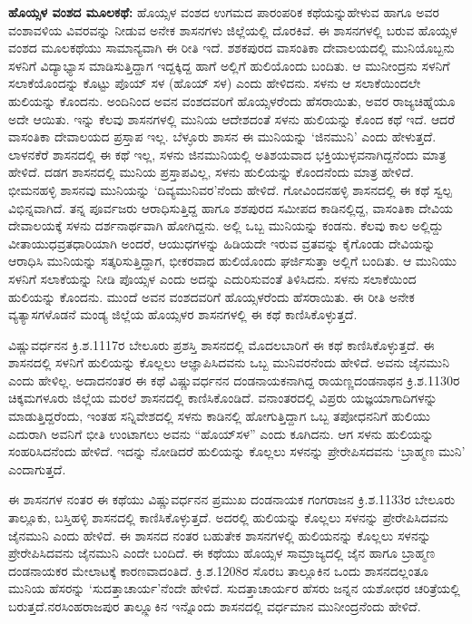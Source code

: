 \textbf{ಹೊಯ್ಸಳ ವಂಶದ ಮೂಲಕಥೆ: } ಹೊಯ್ಸಳ ವಂಶದ ಉಗಮದ ಪಾರಂಪರಿಕ ಕಥೆಯನ್ನುಹೇಳುವ ಹಾಗೂ ಅವರ ವಂಶಾವಳಿಯ ವಿವರವನ್ನು ನೀಡುವ ಅನೇಕ ಶಾಸನಗಳು ಜಿಲ್ಲೆಯಲ್ಲಿ ದೊರಕಿವೆ. ಈ ಶಾಸನಗಳಲ್ಲಿ ಬರುವ ಹೊಯ್ಸಳ ವಂಶದ ಮೂಲಕಥೆಯು ಸಾಮಾನ್ಯವಾಗಿ ಈ ರೀತಿ ಇದೆ. ಶಶಕಪುರದ ವಾಸಂತಿಕಾ ದೇವಾಲಯದಲ್ಲಿ ಮುನಿಯೊಬ್ಬನು ಸಳನಿಗೆ ವಿದ್ಯಾಭ್ಯಾಸ ಮಾಡಿಸುತ್ತಿದ್ದಾಗ ಇದ್ದಕ್ಕಿದ್ದ ಹಾಗೆ ಅಲ್ಲಿಗೆ ಹುಲಿಯೊಂದು ಬಂದಿತು. ಆ ಮುನೀಂದ್ರನು ಸಳನಿಗೆ ಸಲಾಕೆಯೊಂದನ್ನು ಕೊಟ್ಟು ಪೊಯ್​ ಸಳ (ಹೊಯ್​ ಸಳ) ಎಂದು ಹೇಳಿದನು. ಸಳನು ಆ ಸಲಾಕೆಯಿಂದಲೇ ಹುಲಿಯನ್ನು ಕೊಂದನು. ಅಂದಿನಿಂದ ಅವನ ವಂಶದವರಿಗೆ ಹೊಯ್ಸಳರೆಂದು ಹೆಸರಾಯಿತು, ಅವರ ರಾಜ್ಯಚಿಹ್ನೆಯೂ ಅದೇ ಆಯಿತು. ಇನ್ನು ಕೆಲವು ಶಾಸನಗಳಲ್ಲಿ ಮುನಿಯ ಆದೇಶದಂತೆ ಸಳನು ಹುಲಿಯನ್ನು ಕೊಂದ ಕಥೆ ಇದೆ. ಆದರೆ ವಾಸಂತಿಕಾ ದೇವಾಲಯದ ಪ್ರಸ್ತಾಪ ಇಲ್ಲ. ಬೆಳ್ಳೂರು ಶಾಸನ ಈ ಮುನಿಯನ್ನು ‘ಜಿನಮುನಿ’ ಎಂದು ಹೇಳುತ್ತದೆ. ಲಾಳನಕೆರೆ ಶಾಸನದಲ್ಲಿ ಈ ಕಥೆ ಇಲ್ಲ, ಸಳನು ಜಿನಮುನಿಯಲ್ಲಿ ಅತಿಶಯವಾದ ಭಕ್ತಿಯುಳ್ಳವನಾಗಿದ್ದನೆಂದು ಮಾತ್ರ ಹೇಳಿದೆ. ದಡಗ ಶಾಸನದಲ್ಲಿ ಮುನಿಯ ಪ್ರಸ್ತಾಪವಿಲ್ಲ, ಸಳನು ಹುಲಿಯನ್ನು ಕೊಂದನೆಂದು ಮಾತ್ರ ಹೇಳಿದೆ. ಭೀಮನಹಳ್ಳಿ ಶಾಸನವು ಮುನಿಯನ್ನು ‘ದಿವ್ಯಮುನಿವರ’ನೆಂದು ಹೇಳಿದೆ. ಗೋವಿಂದನಹಳ್ಳಿ ಶಾಸನದಲ್ಲಿ ಈ ಕಥೆ ಸ್ವಲ್ಪ ವಿಭಿನ್ನವಾಗಿದೆ. ತನ್ನ ಪೂರ್ವಜರು ಆರಾಧಿಸುತ್ತಿದ್ದ ಹಾಗೂ ಶಶಪುರದ ಸಮೀಪದ ಕಾಡಿನಲ್ಲಿದ್ದ, ವಾಸಂತಿಕಾ ದೇವಿಯ ದೇವಾಲಯಕ್ಕೆ ಸಳನು ದರ್ಶನಾರ್ಥವಾಗಿ ಹೋಗಿದ್ದನು. ಅಲ್ಲಿ ಒಬ್ಬ ಮುನಿಯನ್ನು ಕಂಡನು. ಕೆಲವು ಕಾಲ ಅಲ್ಲಿದ್ದು ವೀತಾಯುಧವ್ರತಧಾರಿಯಾಗಿ ಅಂದರೆ, ಆಯುಧಗಳನ್ನು ಹಿಡಿಯದೇ ಇರುವ ವ್ರತವನ್ನು ಕೈಗೊಂಡು ದೇವಿಯನ್ನು ಆರಾಧಿಸಿ ಮುನಿಯನ್ನು ಸತ್ಕರಿಸುತ್ತಿದ್ದಾಗ, ಭೀಕರವಾದ ಹುಲಿಯೊಂದು ಘರ್ಜಿಸುತ್ತಾ ಅಲ್ಲಿಗೆ ಬಂದಿತು. ಆ ಮುನಿಯು ಸಳನಿಗೆ ಸಲಾಕೆಯನ್ನು ನೀಡಿ ಪೊಯ್ಸಳ ಎಂದು ಅದನ್ನು ಎದುರಿಸುವಂತೆ ತಿಳಿಸಿದನು. ಸಳನು ಸಲಾಕೆಯಿಂದ ಹುಲಿಯನ್ನು ಕೊಂದನು. ಮುಂದೆ ಅವನ ವಂಶದವರಿಗೆ ಹೊಯ್ಸಳರೆಂದು ಹೆಸರಾಯಿತು. ಈ ರೀತಿ ಅನೇಕ ವ್ಯತ್ಯಾಸಗಳೊಡನೆ ಮಂಡ್ಯ ಜಿಲ್ಲೆಯ ಹೊಯ್ಸಳರ ಶಾಸನಗಳಲ್ಲಿ ಈ ಕಥೆ ಕಾಣಿಸಿಕೊಳ್ಳುತ್ತದೆ.

ವಿಷ್ಣುವರ್ಧನನ ಕ್ರಿ.ಶ.1117ರ ಬೇಲೂರು ಪ್ರಶಸ್ತಿ ಶಾಸನದಲ್ಲಿ ಮೊದಲಬಾರಿಗೆ ಈ ಕಥೆ ಕಾಣಿಸಿಕೊಳ್ಳುತ್ತದೆ. ಈ ಶಾಸನದಲ್ಲಿ ಸಳನಿಗೆ ಹುಲಿಯನ್ನು ಕೊಲ್ಲಲು ಆಜ್ಞಾಪಿಸಿದವನು ಒಬ್ಬ ಮುನಿವರನೆಂದು ಹೇಳಿದೆ. ಅವನು ಜೈನಮುನಿ ಎಂದು ಹೇಳಿಲ್ಲ. ಅದಾದನಂತರ ಈ ಕಥೆ ವಿಷ್ಣುವರ್ಧನನ ದಂಡನಾಯಕನಾಗಿದ್ದ ರಾಯಣ್ಣದಂಡನಾಥನ ಕ್ರಿ.ಶ.1130ರ ಚಿಕ್ಕಮಗಳೂರು ಜಿಲ್ಲೆಯ ಮರಲೆ ಶಾಸನದಲ್ಲಿ ಕಾಣಿಸಿಕೊಂಡಿದೆ. ವನಾಂತರದಲ್ಲಿ ವಿಪ್ರರು ಯಜ್ಞಯಾಗಾದಿಗಳನ್ನು ಮಾಡುತ್ತಿದ್ದರೆಂದು, ಇಂತಹ ಸನ್ನಿವೇಶದಲ್ಲಿ ಸಳನು ಕಾಡಿನಲ್ಲಿ ಹೋಗುತ್ತಿದ್ದಾಗ ಒಬ್ಬ ತಪೋಧನನಿಗೆ ಹುಲಿಯು ಎದುರಾಗಿ ಅವನಿಗೆ ಭೀತಿ ಉಂಟಾಗಲು ಅವನು “ಹೊಯ್​ಸಳ” ಎಂದು ಕೂಗಿದನು. ಆಗ ಸಳನು ಹುಲಿಯನ್ನು ಸಂಹರಿಸಿದನೆಂದು ಹೇಳಿದೆ. ಇದನ್ನು ನೋಡಿದರೆ ಹುಲಿಯನ್ನು ಕೊಲ್ಲಲು ಸಳನನ್ನು ಪ್ರೇರೇಪಿಸದವನು ‘ಬ್ರಾಹ್ಮಣ ಮುನಿ’ ಎಂದಾಗುತ್ತದೆ.

ಈ ಶಾಸನಗಳ ನಂತರ ಈ ಕಥೆಯು ವಿಷ್ಣುವರ್ಧನನ ಪ್ರಮುಖ ದಂಡನಾಯಕ ಗಂಗರಾಜನ ಕ್ರಿ.ಶ.1133ರ ಬೇಲೂರು ತಾಲ್ಲೂಕು, ಬಸ್ತಿಹಳ್ಳಿ ಶಾಸನದಲ್ಲಿ ಕಾಣಿಸಿಕೊಳ್ಳುತ್ತದೆ. ಅದರಲ್ಲಿ ಹುಲಿಯನ್ನು ಕೊಲ್ಲಲು ಸಳನನ್ನು ಪ್ರೇರೇಪಿಸಿದವನು ಜೈನಮುನಿ ಎಂದು ಹೇಳಿದೆ. ಈ ಶಾಸನದ ನಂತರ ಬಹುತೇಕ ಶಾಸನಗಳಲ್ಲಿ ಹುಲಿಯನನ್ನು ಕೊಲ್ಲಲು ಸಳನನ್ನು ಪ್ರೇರೇಪಿಸಿದವನು ಜೈನಮುನಿ ಎಂದೇ ಬಂದಿದೆ. ಈ ಕಥೆಯು ಹೊಯ್ಸಳ ಸಾಮ್ರಾಜ್ಯದಲ್ಲಿ ಜೈನ ಹಾಗೂ ಬ್ರಾಹ್ಮಣ ದಂಡನಾಯಕರ ಮೇಲಾಟಕ್ಕೆ ಕಾರಣವಾದಂತಿದೆ. ಕ್ರಿ.ಶ.1208ರ ಸೊರಬ ತಾಲ್ಲೂಕಿನ ಒಂದು ಶಾಸನದಲ್ಲಂತೂ ಮುನಿಯ ಹೆಸರನ್ನು ‘ಸುದತ್ತಾಚಾರ್ಯ’ನೆಂದೇ ಹೇಳಿದೆ. ಸುದತ್ತಾಚಾರ್ಯರ ಹೆಸರು ಜನ್ನನ ಯಶೋಧರ ಚರಿತ್ರೆಯಲ್ಲಿ ಬರುತ್ತದೆ.\break ನರಸಿಂಹರಾಜಪುರ ತಾಲ್ಲ್ಲೂಕಿನ ಇನ್ನೊಂದು ಶಾಸನದಲ್ಲಿ ವರ್ಧಮಾನ ಮುನೀಂದ್ರನೆಂದು ಹೇಳಿದೆ.

